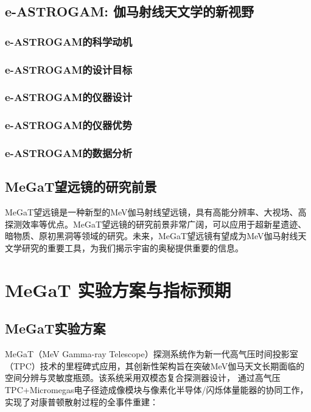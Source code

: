 \subsection{e-ASTROGAM: 伽马射线天文学的新视野}

\subsubsection{e-ASTROGAM的科学动机}

\subsubsection{e-ASTROGAM的设计目标}

\subsubsection{e-ASTROGAM的仪器设计}

\subsubsection{e-ASTROGAM的仪器优势}

\subsubsection{e-ASTROGAM的数据分析}



\subsection{MeGaT望远镜的研究前景}
MeGaT望远镜是一种新型的MeV伽马射线望远镜，具有高能分辨率、大视场、高探测效率等优点。MeGaT望远镜的研究前景非常广阔，可以应用于超新星遗迹、暗物质、原初黑洞等领域的研究。未来，MeGaT望远镜有望成为MeV伽马射线天文学研究的重要工具，为我们揭示宇宙的奥秘提供重要的信息。\par


\section{MeGaT 实验方案与指标预期}
\label{sec:plan}
\subsection{MeGaT实验方案}
MeGaT（MeV Gamma-ray Telescope）探测系统作为新一代高气压时间投影室（TPC）技术的里程碑式应用，其创新性架构旨在突破MeV伽马天文长期面临的空间分辨与灵敏度瓶颈。该系统采用双模态复合探测器设计，
通过高气压TPC+Micromegas电子径迹成像模块与像素化半导体/闪烁体量能器的协同工作，实现了对康普顿散射过程的全事件重建：
